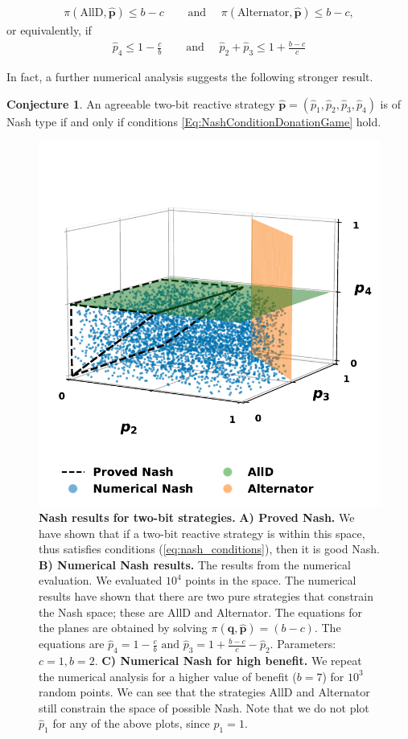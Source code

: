 \documentclass{article}
\theoremstyle{definition}
\newtheorem{conjecture}[theorem]{Conjecture}
\begin{document}
\begin{align*}
\pi(\text{AllD}, \mathbf{\hat{p}}) \leq b\!-\!c & \quad \text{ and } \quad \pi(\text{Alternator}, \mathbf{\hat{p}}) \leq b\!-\!c,
\end{align*}
or equivalently, if
\begin{align}\label{Eq:NashConditionDonationGame}
  \hat{p}_4 \leq 1 - \frac{c}{b} & \quad \text{ and } \quad  \hat{p}_2 + \hat{p}_3 \leq 1 + \frac{b\!-\!c}{c}
\end{align}

In fact, a further numerical analysis suggests the following stronger result. 

\begin{conjecture}\label{conjecture:nash_from_numerical_results}
An agreeable two-bit reactive strategy \(\mathbf{\hat{p}} = (\hat{p}_{1}, \hat{p}_{2}, \hat{p}_{3}, \hat{p}_{4})\) is of Nash type if and only if conditions \eqref{Eq:NashConditionDonationGame} hold. 
\end{conjecture}

\begin{figure}[!htbp]
  \centering
  \includegraphics[width=.35\textwidth]{static/for_akin.pdf}
  \caption{\textbf{Nash results for two-bit strategies.}
  \textbf{A) Proved Nash.} We have shown that if a two-bit reactive
  strategy is within this space, thus satisfies conditions
  (\ref{eq:nash_conditions}), then it is good Nash. \textbf{B) Numerical Nash
  results.} The results from the numerical evaluation. We evaluated \(10 ^ 4\) points in
  the space. The numerical results have shown that there are two pure
  strategies that constrain the Nash space; these are AllD and Alternator.
  The equations for the planes are obtained by solving
  \(\pi(\mathbf{q}, \mathbf{\hat{p}}) = (b\!-\!c)\). The equations are
  \(\hat{p}_4 = 1 - \frac{c}{b} \text{ and }  \hat{p}_3 = 1 + \frac{b\!-\!c}{c} - \hat{p}_2\).
  Parameters: \(c=1, b=2\). \textbf{C) Numerical Nash for high benefit.} We repeat
  the numerical analysis for a higher value of benefit
  (\(b=7\)) for \(10 ^ 3\) random points. We can see that the strategies AllD
  and Alternator still constrain the space of possible Nash. Note that we do
  not plot \(\hat{p}_1\) for any of the above plots, since \(\hat{p}_1=1\).
  }\label{fig:two_bit_reactive_nash_results}
\end{figure}


\end{document}
